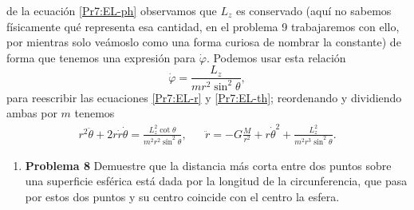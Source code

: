 \documentclass{article}
\begin{document}
de la ecuaci\'on \eqref{Pr7:EL-ph} observamos que $L_z$ es conservado (aqu\'i no sabemos f\'isicamente qu\'e representa esa cantidad, en el problema 9 trabajaremos con ello, por mientras solo ve\'amoslo como una forma curiosa de nombrar la constante) de forma que tenemos una expresi\'on para $\dot{\varphi}$. Podemos usar esta relaci\'on
\begin{equation*}
    \dot\varphi = \frac{L_z}{mr^2\sin^2\theta},
\end{equation*}
para reescribir las ecuaciones \eqref{Pr7:EL-r} y \eqref{Pr7:EL-th}; reordenando y dividiendo ambas por $m$ tenemos
\begin{align}
    &r^2\ddot{\theta}+2r\dot{r}\dot{\theta} = \frac{L_z^2\cot\theta}{m^2r^2\sin^2\theta},& &\ddot{r}=-G\frac{M}{r^2}+r\dot{\theta}^2+\frac{L_z^2}{m^2r^3\sin^2\theta}.&
\end{align} 

\vspace{0.5cm}
\begin{center}
\end{center}  \vspace{0.5cm}

\begin{enumerate}[label={{\textcolor{trueblue}{\textbf{Pr.} \arabic*.8}}}, start=2]
  \item \textbf{Problema 8} Demuestre que la distancia más corta entre dos puntos sobre una superficie
  esférica está dada por la longitud de la circunferencia, que pasa por estos dos puntos  y su centro coincide con el centro la esfera.
\end{enumerate}
\end{document}

